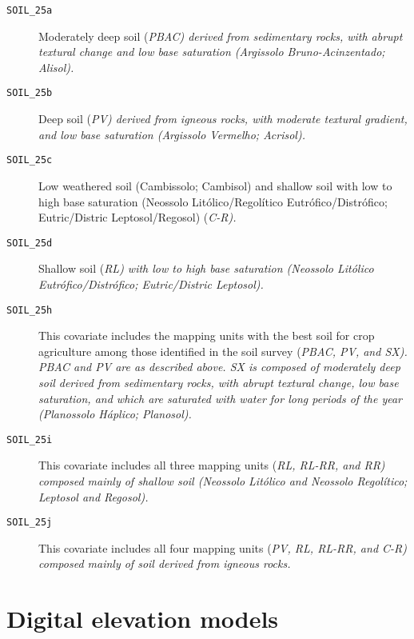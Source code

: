 \begin{description}
  \item[\tt{SOIL\_25a}] Moderately deep soil (\it{PBAC}) derived from sedimentary rocks, with abrupt textural
  change and low base saturation (Argissolo Bruno-Acinzentado; Alisol).
  
  \item[\tt{SOIL\_25b}] Deep soil (\it{PV}) derived from igneous rocks, with moderate textural gradient,
  and low base saturation (Argissolo Vermelho; Acrisol).
 
  \item[\tt{SOIL\_25c}] Low weathered soil (Cambissolo; Cambisol) and shallow soil with low to high base
  saturation (Neossolo Litólico/Regolítico Eutrófico/Distrófico; Eutric/Distric Leptosol/Regosol) (\it{C-R}).
 
  \item[\tt{SOIL\_25d}] Shallow soil (\it{RL}) with low to high base saturation (Neossolo Litólico 
  Eutrófico/Distrófico; Eutric/Distric Leptosol).
 
  \item[\tt{SOIL\_25h}] This covariate includes the mapping units with the best soil for crop agriculture
  among those identified in the soil survey (\it{PBAC}, \it{PV}, and \it{SX}). \it{PBAC} and \it{PV} are as
  described above. \textit{SX} is composed of moderately deep soil derived from sedimentary rocks, with abrupt 
  textural change, low base saturation, and which are saturated with water for long periods of the year 
  (Planossolo Háplico; Planosol).
  
  \item[\tt{SOIL\_25i}] This covariate includes all three mapping units (\it{RL}, \it{RL-RR}, and \it{RR})
  composed mainly of shallow soil (Neossolo Litólico and Neossolo Regolítico; Leptosol and Regosol).
  
  \item[\tt{SOIL\_25j}] This covariate includes all four mapping units (\it{PV}, \it{RL}, \it{RL-RR}, and 
  \it{C-R}) composed mainly of soil derived from igneous rocks.
\end{description}

\tocless\section{Digital elevation models}
\label{sec:covar-data-dem}


